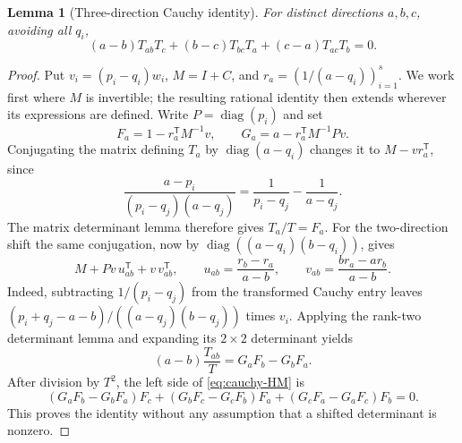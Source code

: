 \documentclass[11pt,a4paper]{article}
\newtheorem{lemma}[theorem]{Lemma}
\theoremstyle{definition}\newtheorem{definition}[theorem]{Definition}
\theoremstyle{remark}\newtheorem{remark}[theorem]{Remark}
\begin{document}
\begin{lemma}[Three-direction Cauchy identity]\label{lem:cauchy-three}
For distinct directions $a,b,c$, avoiding all $q_i$,
\begin{equation}\label{eq:cauchy-HM}
 (a-b)T_{ab}T_c+(b-c)T_{bc}T_a+(c-a)T_{ac}T_b=0.
\end{equation}
\end{lemma}
\begin{proof}
Put $v_i=(p_i-q_i)w_i$, $M=I+C$, and
$r_a=(1/(a-q_i))_{i=1}^s$. We work first where $M$ is invertible;
the resulting rational identity then extends wherever its expressions
are defined. Write $P=\operatorname{diag}(p_i)$ and set
\[
 F_a=1-r_a^{\mathsf T}M^{-1}v,\qquad
 G_a=a-r_a^{\mathsf T}M^{-1}Pv.
\]
Conjugating the matrix defining $T_a$ by
$\operatorname{diag}(a-q_i)$ changes it to $M-vr_a^{\mathsf T}$, since
\[
 \frac{a-p_i}{(p_i-q_j)(a-q_j)}
       =\frac1{p_i-q_j}-\frac1{a-q_j}.
\]
The matrix determinant lemma therefore gives $T_a/T=F_a$.
For the two-direction shift the same conjugation, now by
$\operatorname{diag}((a-q_i)(b-q_i))$, gives
\[
 M+Pv\,u_{ab}^{\mathsf T}+v\,v_{ab}^{\mathsf T},\qquad
 u_{ab}=\frac{r_b-r_a}{a-b},\qquad
 v_{ab}=\frac{b r_a-a r_b}{a-b}.
\]
Indeed, subtracting $1/(p_i-q_j)$ from the transformed Cauchy entry
leaves $(p_i+q_j-a-b)/((a-q_j)(b-q_j))$ times $v_i$.
Applying the rank-two determinant lemma and expanding its $2\times2$
determinant yields
\[
 (a-b)\frac{T_{ab}}T=G_aF_b-G_bF_a.
\]
After division by $T^2$, the left side of \eqref{eq:cauchy-HM} is
\[
 (G_aF_b-G_bF_a)F_c+(G_bF_c-G_cF_b)F_a
                         +(G_cF_a-G_aF_c)F_b=0.
\]
This proves the identity without any assumption that a shifted determinant
is nonzero.
\end{proof}
\end{document}
